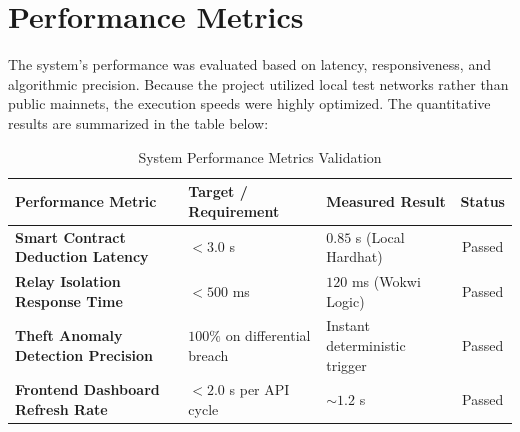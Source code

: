 \section{Performance Metrics}
The system's performance was evaluated based on latency, responsiveness, and algorithmic precision. Because the project utilized local test networks rather than public mainnets, the execution speeds were highly optimized. The quantitative results are summarized in the table below:
\begin{table}[htbp]
    \centering
    \caption{System Performance Metrics Validation}
    \vspace{0.2cm} %
    \renewcommand{\arraystretch}{1.4} %
    \begin{tabular}{|l|l|l|c|}
        \hline
        \textbf{Performance Metric} & \textbf{Target / Requirement} & \textbf{Measured Result} & \textbf{Status} \\
        \hline
        \textbf{Smart Contract Deduction Latency} & $< 3.0$ s & $0.85$ s (Local Hardhat) & Passed \\
        \hline
        \textbf{Relay Isolation Response Time} & $< 500$ ms & $120$ ms (Wokwi Logic) & Passed \\
        \hline
        \textbf{Theft Anomaly Detection Precision} & $100\%$ on differential breach & Instant deterministic trigger & Passed \\
        \hline
        \textbf{Frontend Dashboard Refresh Rate} & $< 2.0$ s per API cycle & $\sim 1.2$ s & Passed \\
        \hline
    \end{tabular}
    \label{tab:performance}
\end{table}

